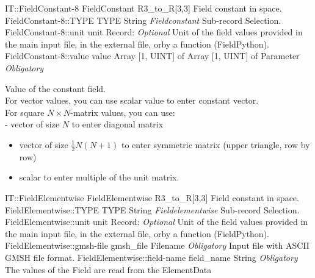\begin{RecordType}
	{IT::FieldConstant-8}
	{FieldConstant}
	{} %
	{} %
	{{{R3{\_}to{\_}R[3,3] Field constant in space.}}}
		\RecKey
			{FieldConstant-8::TYPE}
			{TYPE}
			{{String}}
			{ \it{Fieldconstant} }
			{{{Sub-record Selection.}}}
		\RecKey
			{FieldConstant-8::unit}
			{unit}
			{{Record}{: }}
			{ \it{Optional} }
			{{{Unit of the field values provided in the main input file, in the external file, orby a function (FieldPython).}}}
		\RecKey
			{FieldConstant-8::value}
			{value}
			{{Array [1, UINT] of }{Array [1, UINT] of }{Parameter}}
			{ \it{Obligatory} }
			{{{{Value of the constant field.}\\{
For vector values, you can use scalar value to enter constant vector.}\\{
For square }{$N\times N$}{-matrix values, you can use:}\\{
 - vector of size }{$N$}{ to enter diagonal matrix}
}
\begin{itemize}
\item {vector of size }{$\frac12N(N+1)$}{ to enter symmetric matrix (upper triangle, row by row)}
\item {scalar to enter multiple of the unit matrix.}
\end{itemize}
}}
\end{RecordType}
\begin{RecordType}
	{IT::FieldElementwise}
	{FieldElementwise}
	{} %
	{} %
	{{{R3{\_}to{\_}R[3,3] Field constant in space.}}}
		\RecKey
			{FieldElementwise::TYPE}
			{TYPE}
			{{String}}
			{ \it{Fieldelementwise} }
			{{{Sub-record Selection.}}}
		\RecKey
			{FieldElementwise::unit}
			{unit}
			{{Record}{: }}
			{ \it{Optional} }
			{{{Unit of the field values provided in the main input file, in the external file, orby a function (FieldPython).}}}
		\RecKey
			{FieldElementwise::gmsh-file}
			{gmsh{\_}file}
			{{Filename}}
			{ \it{Obligatory} }
			{{{Input file with ASCII GMSH file format.}}}
		\RecKey
			{FieldElementwise::field-name}
			{field{\_}name}
			{{String}}
			{ \it{Obligatory} }
			{{{The values of the Field are read from the }\ttfamily {\$}ElementData}}
\end{RecordType}
